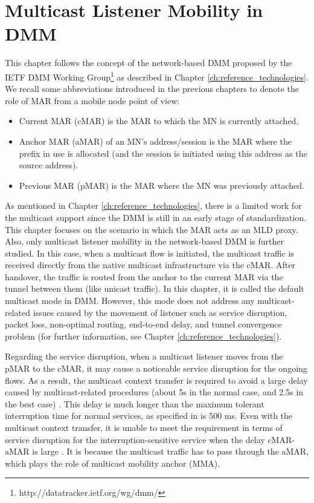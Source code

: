 \section{Multicast Listener Mobility in DMM} \label{c10:multicast_listener}

This chapter follows the concept of the network-based DMM proposed by the IETF DMM Working Group\footnote{http://datatracker.ietf.org/wg/dmm/} as described in Chapter \ref{ch:reference_technologies}. We recall some abbreviations introduced in the previous chapters to denote the role of MAR from a mobile node point of view:
\begin{itemize}
\item Current MAR (cMAR) is the MAR to which the MN is currently attached.
\item Anchor MAR (aMAR) of an MN's address/session is the MAR where the prefix in use is allocated (and the session is initiated using this address as the source address).  
\item Previous MAR (pMAR) is the MAR where the MN was previously attached. 
\end{itemize}

As mentioned in Chapter \ref{ch:reference_technologies}, there is a limited work for the multicast support since the DMM is still in an early stage of standardization.  This chapter focuses on the scenario in which the MAR acts as an MLD proxy. Also, only multicast listener mobility in the network-based DMM is further studied. In this case, when a multicast flow is initiated, the multicast traffic is received directly from the native multicast infrastructure via the cMAR. After handover, the traffic is routed from the anchor to the current MAR via the tunnel between them (like unicast traffic). In this chapter, it is called the default multicast mode in DMM. However, this mode does not address any multicast-related issues caused by the movement of listener such as service disruption, packet loss, non-optimal routing, end-to-end delay, and tunnel convergence problem (for further information, see Chapter \ref{ch:reference_technologies}). 

Regarding the service disruption, when a multicast listener moves from the pMAR to the cMAR, it may cause a noticeable service disruption for the ongoing flows. As a result, the multicast context transfer is required to avoid a large delay caused by multicast-related procedures (about 5s in the normal case, and 2.5s in the best case) \cite{Thinh_WCNC_Multicast}. This delay is much longer than the maximum tolerant interruption time for normal services, as specified in \cite{interruption_requirements} is 500 ms. Even with the multicast context transfer, it is unable to meet the requirement in terms of service disruption for the interruption-sensitive service when the delay cMAR-aMAR is large \cite{Thinh_ICNS, multicast_DMM_Sergio_PIMRC}. It is because the multicast traffic has to pass through the aMAR, which plays the role of multicast mobility anchor (MMA).  

